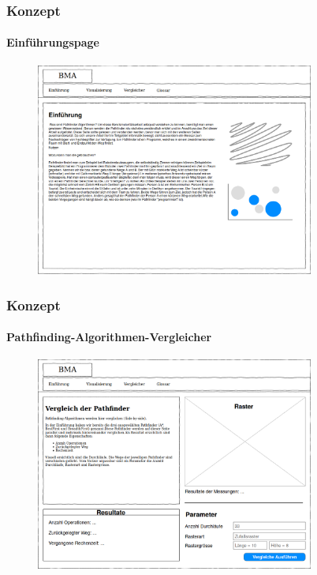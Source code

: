 \documentclass[professionalfont,serif,german]{beamer}
\begin{document}
\begin{frame}
  \frametitle{Konzept}
  \framesubtitle{Einführungspage}
  \begin{figure}
    \includegraphics[height=7cm]{img/einfuehrung1.png}
  \end{figure}
\end{frame}

\begin{frame}
  \frametitle{Konzept}
  \framesubtitle{Pathfinding-Algorithmen-Vergleicher}
  \begin{figure}
    \includegraphics[height=7cm]{img/konzept1.png}
  \end{figure}
\end{frame}

\end{document}
